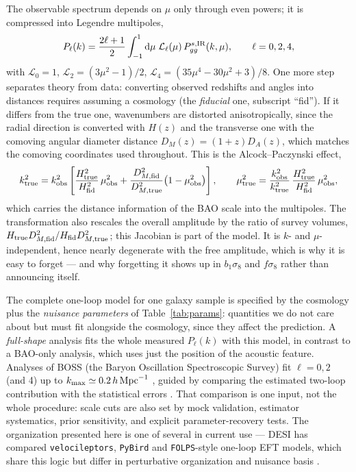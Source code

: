 \documentclass[a4paper,11pt]{article}
\newcommand{\dd}{\mathrm{d}}
\numberwithin{equation}{section}
\begin{document}
The observable spectrum depends on $\mu$ only through even powers; it is compressed into Legendre multipoles,
\begin{equation}
P_\ell(k) = \frac{2\ell+1}{2}\int_{-1}^{1}\dd\mu\;
\mathcal{L}_\ell(\mu)\,P^{s,\rm IR}_{gg}(k,\mu),
\qquad \ell = 0, 2, 4 ,
\label{eq:multipoles}
\end{equation}
with $\mathcal{L}_0 = 1$, $\mathcal{L}_2 = (3\mu^2-1)/2$, $\mathcal{L}_4 = (35\mu^4-30\mu^2+3)/8$. One more step separates theory from data: converting observed redshifts and angles into distances requires assuming a cosmology (the \emph{fiducial} one, subscript ``fid''). If it differs from the true one, wavenumbers are distorted anisotropically, since the radial direction is converted with $H(z)$ and the transverse one with the comoving angular diameter distance $D_M(z) = (1+z)D_A(z)$, which matches the comoving coordinates used throughout. This is the Alcock--Paczynski effect,
\begin{equation}
k_{\rm true}^2 = k_{\rm obs}^2\left[
\frac{H_{\rm true}^2}{H_{\rm fid}^2}\,\mu_{\rm obs}^2
+ \frac{D_{M,\rm fid}^2}{D_{M,\rm true}^2}\big(1-\mu_{\rm obs}^2\big)\right],
\qquad
\mu_{\rm true}^2 = \frac{k_{\rm obs}^2}{k_{\rm true}^2}\,
\frac{H_{\rm true}^2}{H_{\rm fid}^2}\,\mu_{\rm obs}^2 ,
\label{eq:ap}
\end{equation}
which carries the distance information of the BAO scale into the multipoles. The transformation also rescales the overall amplitude by the ratio of survey volumes, $H_{\rm true}D_{M,\rm fid}^2/H_{\rm fid}D_{M,\rm true}^2$; this Jacobian is part of the model. It is $k$- and $\mu$-independent, hence nearly degenerate with the free amplitude, which is why it is easy to forget --- and why forgetting it shows up in $b_1\sigma_8$ and $f\sigma_8$ rather than announcing itself.

The complete one-loop model for one galaxy sample is specified by the cosmology plus the \emph{nuisance parameters} of Table~\ref{tab:params}: quantities we do not care about but must fit alongside the cosmology, since they affect the prediction. A \emph{full-shape} analysis fits the whole measured $P_\ell(k)$ with this model, in contrast to a BAO-only analysis, which uses just the position of the acoustic feature. Analyses of BOSS (the Baryon Oscillation Spectroscopic Survey) fit $\ell = 0, 2$ (and 4) up to $k_{\rm max} \simeq 0.2\,h\,{\rm Mpc}^{-1}$ \cite{Ivanov2020}, guided by comparing the estimated two-loop contribution with the statistical errors \cite{ChudaykinIvanov2019}. That comparison is one input, not the whole procedure: scale cuts are also set by mock validation, estimator systematics, prior sensitivity, and explicit parameter-recovery tests. The organization presented here is one of several in current use --- DESI has compared \texttt{velocileptors}, \texttt{PyBird} and \texttt{FOLPS}-style one-loop EFT models, which share this logic but differ in perturbative organization and nuisance basis \cite{Maus2024,DESI2024V}.
\end{document}

